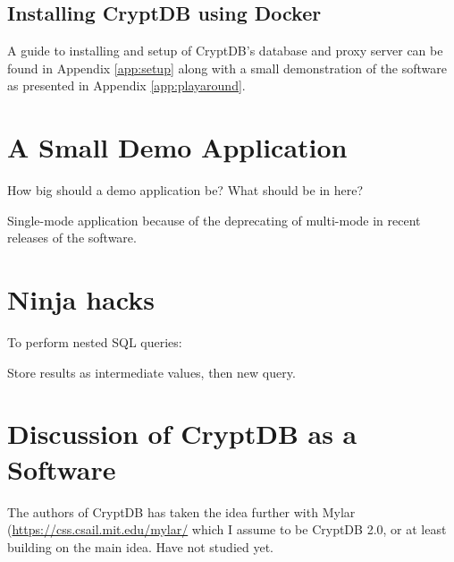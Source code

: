 \subsection{Installing CryptDB using Docker}

A guide to installing and setup of CryptDB's database and proxy server can be found in Appendix \ref{app:setup} along with a small demonstration of the software as presented in Appendix \ref{app:playaround}.

\section{A Small Demo Application}

How big should a demo application be? What should be in here?

Single-mode application because of the deprecating of multi-mode in recent releases of the software.

\section{Ninja hacks}

To perform nested SQL queries:

Store results as intermediate values, then new query.



\section{Discussion of CryptDB as a Software}

The authors of CryptDB has taken the idea further with Mylar (\url{https://css.csail.mit.edu/mylar/} which I assume to be CryptDB 2.0, or at least building on the main idea. Have not studied yet.